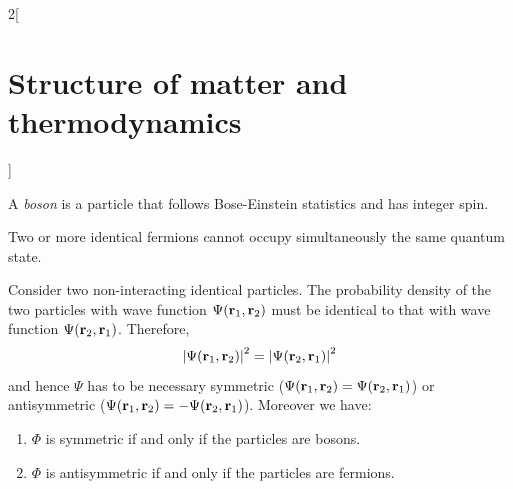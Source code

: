 \documentclass[../../../main.tex]{subfiles}
\begin{document}
\begin{multicols}{2}[\section{Structure of matter and thermodynamics}]
\begin{definition}[Boson]
        A \textit{boson} is a particle that follows Bose-Einstein statistics and has integer spin.
    \end{definition}
    \begin{prop}
        Two or more identical fermions cannot occupy simultaneously the same quantum state.
    \end{prop}
    \begin{prop}
        Consider two non-interacting identical particles. The probability density of the two particles with wave function $\Psi(\boldsymbol{\mathrm{r}}_1,\boldsymbol{\mathrm{r}}_2)$ must be identical to that with wave function $\Psi(\boldsymbol{\mathrm{r}}_2,\boldsymbol{\mathrm{r}}_1)$. Therefore, $${|\Psi(\boldsymbol{\mathrm{r}}_1,\boldsymbol{\mathrm{r}}_2)|}^2={|\Psi(\boldsymbol{\mathrm{r}}_2,\boldsymbol{\mathrm{r}}_1)|}^2$$ and hence $\Psi$ has to be necessary symmetric ($\Psi(\boldsymbol{\mathrm{r}}_1,\boldsymbol{\mathrm{r}}_2)=\Psi(\boldsymbol{\mathrm{r}}_2,\boldsymbol{\mathrm{r}}_1)$) or antisymmetric ($\Psi(\boldsymbol{\mathrm{r}}_1,\boldsymbol{\mathrm{r}}_2)=-\Psi(\boldsymbol{\mathrm{r}}_2,\boldsymbol{\mathrm{r}}_1)$). Moreover we have:
        \begin{enumerate}
            \item $\Phi$ is symmetric if and only if the particles are bosons.
            \item $\Phi$ is antisymmetric if and only if the particles are fermions.
        \end{enumerate}
    \end{prop}

\end{multicols}
\end{document}
